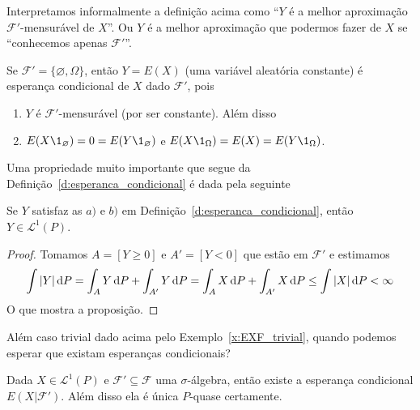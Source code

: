 Interpretamos informalmente a definição acima como ``$Y$ é a melhor aproximação $\mathcal{F}'$-mensurável de $X$''.
Ou $Y$ é a melhor aproximação que podermos fazer de $X$ se ``conhecemos apenas $\mathcal{F}'$''.

\begin{example}
  \label{x:EXF_trivial}
  Se $\mathcal{F}' = \{\varnothing, \Omega\}$, então $Y = E(X)$ (uma variável aleatória constante) é esperança condicional de $X$ dado $\mathcal{F}'$, pois
  \begin{enumerate}[\quad a)]
  \item $Y$ é $\mathcal{F}'$-mensurável (por ser constante). Além disso
  \item $E(X \1_\varnothing) = 0 = E(Y \1_\varnothing)$ e $E(X \1_\Omega) = E(X) = E(Y \1_\Omega)$.
  \end{enumerate}
\end{example}

Uma propriedade muito importante que segue da Definição~\ref{d:esperanca_condicional} é dada pela seguinte

\begin{proposition}
  \label{p:ec_em_L1}
  Se $Y$ satisfaz as $a)$ e $b)$ em Definição~\ref{d:esperanca_condicional}, então $Y \in \mathcal{L}^1(P)$.
\end{proposition}

\begin{proof}
  Tomamos $A = [Y \geq 0]$ e $A' = [Y < 0]$ que estão em $\mathcal{F}'$ e estimamos
  \begin{equation}
    \int |Y| \mathop{}\!\mathrm{d} P = \int_A Y \mathop{}\!\mathrm{d} P + \int_{A'} Y \mathop{}\!\mathrm{d} P = \int_A X \mathop{}\!\mathrm{d} P + \int_{A'} X \mathop{}\!\mathrm{d} P \leq \int |X| \mathop{}\!\mathrm{d} P < \infty
  \end{equation}
  O que mostra a proposição.
\end{proof}

Além caso trivial dado acima pelo Exemplo~\ref{x:EXF_trivial}, quando podemos esperar que existam esperanças condicionais?

\begin{theorem}
  Dada $X \in \mathcal{L}^1(P)$ e $\mathcal{F}' \subseteq \mathcal{F}$ uma $\sigma$-álgebra, então existe a esperança condicional $E(X|\mathcal{F}')$.
  Além disso ela é única $P$-quase certamente.
\end{theorem}

